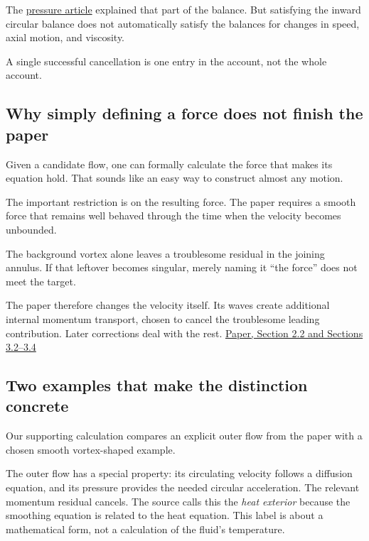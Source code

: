 \documentclass[
  english,
  11pt,
]{article}
\begin{document}
The \href{../d6_axis_pressure/article.html}{pressure article} explained
that part of the balance. But satisfying the inward circular balance
does not automatically satisfy the balances for changes in speed, axial
motion, and viscosity.

A single successful cancellation is one entry in the account, not the
whole account.

\subsection{Why simply defining a force does not finish the
paper}\label{why-simply-defining-a-force-does-not-finish-the-paper}

Given a candidate flow, one can formally calculate the force that makes
its equation hold. That sounds like an easy way to construct almost any
motion.

The important restriction is on the resulting force. The paper requires
a smooth force that remains well behaved through the time when the
velocity becomes unbounded.

The background vortex alone leaves a troublesome residual in the joining
annulus. If that leftover becomes singular, merely naming it ``the
force'' does not meet the target.

The paper therefore changes the velocity itself. Its waves create
additional internal momentum transport, chosen to cancel the troublesome
leading contribution. Later corrections deal with the rest.
\href{https://cdn.openai.com/pdf/32d9f210-8b73-45e0-91bc-82a30aef8a9a/navier-stokes.pdf}{Paper,
Section 2.2 and Sections 3.2--3.4}

\subsection{Two examples that make the distinction
concrete}\label{two-examples-that-make-the-distinction-concrete}

Our supporting calculation compares an explicit outer flow from the
paper with a chosen smooth vortex-shaped example.

The outer flow has a special property: its circulating velocity follows
a diffusion equation, and its pressure provides the needed circular
acceleration. The relevant momentum residual cancels. The source calls
this the \emph{heat exterior} because the smoothing equation is related
to the heat equation. This label is about a mathematical form, not a
calculation of the fluid's temperature.
\end{document}

